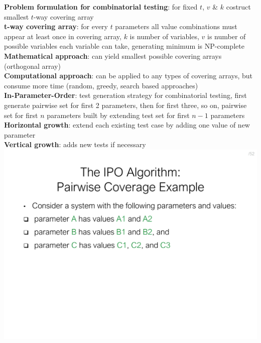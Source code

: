 \documentclass[a4paper]{article}
\begin{document}
\begin{multicols}{3}
        \textbf{Problem formulation for combinatorial testing}: for fixed $t$, $v$ \& $k$ costruct smallest $t$-way covering array\\
        \textbf{t-way covering array}: for every $t$ parameters all value combinations must appear at least once in covering array, $k$ is number of variables, $v$ is number of possible variables each variable can take, generating minimum is NP-complete\\
        \textbf{Mathematical approach}: can yield smallest possible covering arrays (orthogonal array)\\
        \textbf{Computational approach}: can be applied to any types of covering arrays, but consume more time (random, greedy, search based approaches)\\
        \textbf{In-Parameter-Order}: test generation strategy for combinatorial testing, first generate pairwise set for first 2 parameters, then for first three, so on, pairwise set for first $n$ parameters built by extending test set for first $n-1$ parameters\\
        \textbf{Horizontal growth}: extend each existing test case by adding one value of new parameter\\
        \textbf{Vertical growth}: adds new tests if necessary\\
        \includegraphics[width=\linewidth]{319.pdf}\\

\end{multicols}
\end{document}
